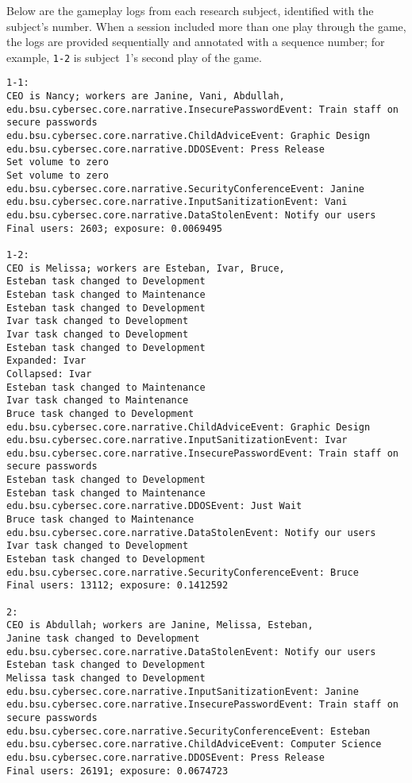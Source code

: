 Below are the gameplay logs from each research subject, identified
with the subject's number.
When a session included more than one play through the game,
the logs are provided sequentially and annotated with a sequence number;
for example, \verb+1-2+ is subject~1's second play of the game.

\begin{verbatim}
1-1:
CEO is Nancy; workers are Janine, Vani, Abdullah, 
edu.bsu.cybersec.core.narrative.InsecurePasswordEvent: Train staff on secure passwords
edu.bsu.cybersec.core.narrative.ChildAdviceEvent: Graphic Design
edu.bsu.cybersec.core.narrative.DDOSEvent: Press Release
Set volume to zero
Set volume to zero
edu.bsu.cybersec.core.narrative.SecurityConferenceEvent: Janine
edu.bsu.cybersec.core.narrative.InputSanitizationEvent: Vani
edu.bsu.cybersec.core.narrative.DataStolenEvent: Notify our users
Final users: 2603; exposure: 0.0069495

1-2:
CEO is Melissa; workers are Esteban, Ivar, Bruce, 
Esteban task changed to Development
Esteban task changed to Maintenance
Esteban task changed to Development
Ivar task changed to Development
Ivar task changed to Development
Esteban task changed to Development
Expanded: Ivar
Collapsed: Ivar
Esteban task changed to Maintenance
Ivar task changed to Maintenance
Bruce task changed to Development
edu.bsu.cybersec.core.narrative.ChildAdviceEvent: Graphic Design
edu.bsu.cybersec.core.narrative.InputSanitizationEvent: Ivar
edu.bsu.cybersec.core.narrative.InsecurePasswordEvent: Train staff on secure passwords
Esteban task changed to Development
Esteban task changed to Maintenance
edu.bsu.cybersec.core.narrative.DDOSEvent: Just Wait
Bruce task changed to Maintenance
edu.bsu.cybersec.core.narrative.DataStolenEvent: Notify our users
Ivar task changed to Development
Esteban task changed to Development
edu.bsu.cybersec.core.narrative.SecurityConferenceEvent: Bruce
Final users: 13112; exposure: 0.1412592

2:
CEO is Abdullah; workers are Janine, Melissa, Esteban, 
Janine task changed to Development
edu.bsu.cybersec.core.narrative.DataStolenEvent: Notify our users
Esteban task changed to Development
Melissa task changed to Development
edu.bsu.cybersec.core.narrative.InputSanitizationEvent: Janine
edu.bsu.cybersec.core.narrative.InsecurePasswordEvent: Train staff on secure passwords
edu.bsu.cybersec.core.narrative.SecurityConferenceEvent: Esteban
edu.bsu.cybersec.core.narrative.ChildAdviceEvent: Computer Science
edu.bsu.cybersec.core.narrative.DDOSEvent: Press Release
Final users: 26191; exposure: 0.0674723


\end{verbatim}
